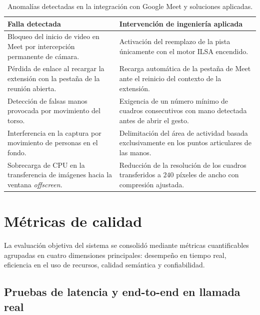\begin{table}[H]
\centering
\small
\caption{Anomalías detectadas en la integración con Google Meet y soluciones aplicadas.}
\label{tab:fallas_integracion}
\begin{tabularx}{\textwidth}{@{}>{\raggedright\arraybackslash}p{} >{\raggedright\arraybackslash}X@{}}
\toprule
\textbf{Falla detectada} & \textbf{Intervención de ingeniería aplicada} \\
\midrule
Bloqueo del inicio de video en Meet por intercepción permanente de cámara. & Activación del reemplazo de la pista únicamente con el motor ILSA encendido. \\
\addlinespace[2pt]
Pérdida de enlace al recargar la extensión con la pestaña de la reunión abierta. & Recarga automática de la pestaña de Meet ante el reinicio del contexto de la extensión. \\
\addlinespace[2pt]
Detección de falsas manos provocada por movimiento del torso. & Exigencia de un número mínimo de cuadros consecutivos con mano detectada antes de abrir el gesto. \\
\addlinespace[2pt]
Interferencia en la captura por movimiento de personas en el fondo. & Delimitación del área de actividad basada exclusivamente en los puntos articulares de las manos. \\
\addlinespace[2pt]
Sobrecarga de CPU en la transferencia de imágenes hacia la ventana \textit{offscreen}. & Reducción de la resolución de los cuadros transferidos a $240$ píxeles de ancho con compresión ajustada. \\
\bottomrule
\end{tabularx}
\end{table}


\section{Métricas de calidad}
\label{sec:metricas_calidad}

La evaluación objetiva del sistema se consolidó mediante métricas cuantificables agrupadas en cuatro dimensiones principales: desempeño en tiempo real, eficiencia en el uso de recursos, calidad semántica y confiabilidad.

\subsection{Pruebas de latencia y end-to-end en llamada real}
\label{sec:eval_telemetria_vivo}
\label{sec:latencias_pipeline}

